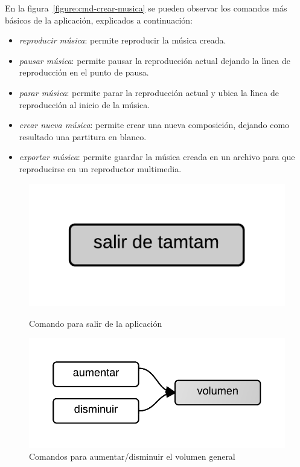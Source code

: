 En la figura~\ref{figure:cmd-crear-musica} se pueden observar los comandos m\'as b\'asicos
de la aplicaci\'on, explicados a continuaci\'on:

\begin{itemize}
\item \emph{reproducir m\'usica}: permite reproducir la m\'usica creada.
\item \emph{pausar m\'usica}: permite pausar la reproducci\'on actual dejando la l{\'\i}nea de reproducci\'on en el
punto de pausa.
\item \emph{parar m\'usica}: permite parar la reproducci\'on actual y ubica la l{\'\i}nea de reproducci\'on al inicio de
la m\'usica.
\item \emph{crear nueva m\'usica}:  permite crear una nueva composici\'on, dejando como resultado una
partitura en blanco.
\item \emph{exportar m\'usica}: permite guardar la m\'usica creada en un archivo para que reproducirse en un
reproductor multimedia.
\end{itemize}

\begin{figure}[H]
\begin{minipage}[b]{0.5\linewidth}
\centering
\includegraphics[width=0.6\linewidth]{./graphics/salir.png}
\caption{Comando para salir de la aplicaci\'on}
\label{figure:cmd-salir}
\end{minipage}
\quad
\begin{minipage}[b]{0.5\linewidth}
\centering
\includegraphics[width=0.6\linewidth]{./graphics/cmd-vol.png}
\caption{Comandos para aumentar/disminuir el volumen general}
\label{figure:cmd-vol}
\end{minipage}
\end{figure}

